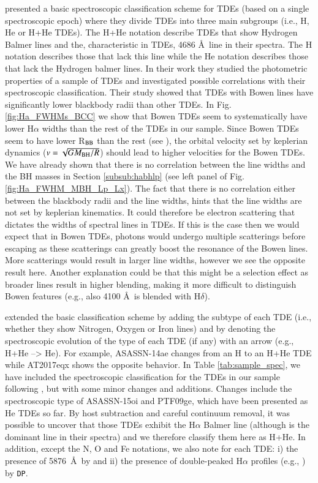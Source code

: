 \documentclass[structabstract]{aa}
\begin{document}
\citet{vanvelzen2021} presented a basic spectroscopic classification scheme for TDEs (based on a single spectroscopic epoch) where they divide TDEs into three main subgroups (i.e., H, He or H+He TDEs). The H+He notation describe TDEs that show Hydrogen Balmer lines and the, characteristic in TDEs,  4686 \AA\, line in their spectra. The H notation describes those that lack this  line while the He notation describes those that lack the Hydrogen balmer lines. In their work they studied the photometric properties of a sample of TDEs and investigated possible correlations with their spectroscopic classification. Their study showed that TDEs with Bowen lines have significantly lower blackbody radii than other TDEs. In Fig. \ref{fig:Ha_FWHMs_BCC} we show that  Bowen TDEs seem to systematically have lower H$\alpha$ widths than the rest of the TDEs in our sample. Since Bowen TDEs seem to have lower R$_{\rm BB}$ than the rest (see \citealt{vanvelzen2021}), the orbital velocity set by keplerian dynamics ($v=\sqrt{GM_{\rm BH}/R}$) should lead to higher velocities for the  Bowen TDEs. We have already shown that there is no correlation between the line widths and the BH masses in Section \ref{subsub:habhlp} (see left panel of Fig. \ref{fig:Ha_FWHM_MBH_Lp_Lx}). The fact that there is no correlation either between the blackbody radii and the line widths, hints that the line widths are not set by keplerian kinematics. It could therefore be electron scattering that dictates the widths of spectral lines in TDEs. If this is the case then we would expect that in Bowen TDEs, photons would undergo multiple scatterings before escaping as these scatterings can greatly boost the resonance of the Bowen lines. More scatterings would result in larger line widths, however we see the opposite result here. Another explanation could be that this might be a selection effect as broader lines result in higher blending, making it more difficult to distinguish Bowen features (e.g., also  4100 \AA\, is blended with H$\delta$). 

\citet{VanVelzen2020} extended the basic classification scheme by adding the subtype of each TDE (i.e., whether they show Nitrogen, Oxygen or Iron lines) and by denoting the spectroscopic evolution of the type of each TDE (if any) with an arrow (e.g., H+He --> He). For example, ASASSN-14ae changes from an H to an H+He TDE while AT2017eqx shows the opposite behavior. In Table \ref{tab:sample_spec}, we have included  
the spectroscopic classification for the TDEs in our sample following \citet{VanVelzen2020}, but with some minor changes and additions. 
Changes include the spectroscopic type of ASASSN-15oi and PTF09ge, which have been presented as He TDEs so far. By host subtraction and careful continuum removal, it was possible to uncover that those TDEs exhibit the H$\alpha$ Balmer line (although  is the dominant line in their spectra) and we therefore classify them here as H+He.
In addition, except the N, O and Fe notations, we also note for each TDE: i) the presence of  5876~\AA\, by  and ii) the presence of double-peaked H$\alpha$ profiles (e.g., \citealt{Holoien2016,Short2020a,Hung2020}) by \texttt{DP}. 
\end{document}
